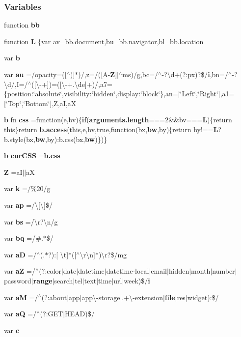 \subsubsection*{Variables}
\begin{DoxyCompactItemize}
\item 
function {\bf bb}
\item 
function {\bf L} \{var av=bb.\+document,bu=bb.\+navigator,bl=bb.\+location
\item 
var {\bf b}
\item 
var {\bf au} =/opacity=([$^\wedge$)]$\ast$)/,z=/([A-\/{\bf Z}]$\vert$$^\wedge$ms)/g,bc=/$^\wedge$-\/?\textbackslash{}d+(?\+:px)?\$/{\bf i},bn=/$^\wedge$-\/?\textbackslash{}d/,I=/$^\wedge$([\textbackslash{}-\/+])=([\textbackslash{}-\/+.\textbackslash{}de]+)/,a7=\{position\+:\char`\"{}absolute\char`\"{},visibility\+:\char`\"{}hidden\char`\"{},display\+:\char`\"{}block\char`\"{}\},an=[\char`\"{}Left\char`\"{},\char`\"{}Right\char`\"{}],a1=[\char`\"{}Top\char`\"{},\char`\"{}Bottom\char`\"{}],Z,aI,aX
\item 
{\bf b} fn {\bf css} =function(e,bv)\{{\bf if}({\bf arguments.\+length}===2\&\&bv==={\bf L})\{return this\}return {\bf b.\+access}(this,e,bv,true,function(bx,{\bf bw},by)\{return by!=={\bf L}?b.\+style(bx,{\bf bw},by)\+:b.\+css(bx,{\bf bw})\})\}
\item 
{\bf b} {\bf cur\+C\+SS} ={\bf b.\+css}
\item 
{\bf Z} =aI$\vert$$\vert$aX
\item 
var {\bf k} =/\%20/g
\item 
var {\bf ap} =/\textbackslash{}[\textbackslash{}]\$/
\item 
var {\bf bs} =/\textbackslash{}r?\textbackslash{}n/g
\item 
var {\bf bq} =/\#.$\ast$\$/
\item 
var {\bf aD} =/$^\wedge$(.$\ast$?)\+:[ \textbackslash{}t]$\ast$([$^\wedge$\textbackslash{}r\textbackslash{}n]$\ast$)\textbackslash{}r?\$/mg
\item 
var {\bf aZ} =/$^\wedge$(?\+:color$\vert$date$\vert$datetime$\vert$datetime-\/local$\vert$email$\vert$hidden$\vert$month$\vert$number$\vert$password$\vert${\bf range}$\vert$search$\vert$tel$\vert$text$\vert$time$\vert$url$\vert$week)\$/{\bf i}
\item 
var {\bf aM} =/$^\wedge$(?\+:about$\vert$app$\vert$app\textbackslash{}-\/storage$\vert$.+\textbackslash{}-\/extension$\vert${\bf file}$\vert$res$\vert$widget)\+:\$/
\item 
var {\bf aQ} =/$^\wedge$(?\+:G\+ET$\vert$H\+E\+AD)\$/
\item 
var {\bf c}
\end{DoxyCompactItemize}


